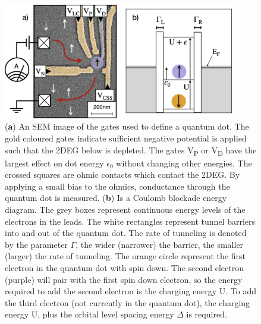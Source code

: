 \begin{figure}[!htb]
 \begin{center}
  \includegraphics[width=0.9\textwidth]{figures/ch1/crop_FiguresMaster.004.png}
  \caption[Quantum dot energy levels]{\label{fig:ch1/dot_energy_levels} 
  (\textbf{a}) An SEM image of the gates used to define a quantum dot. The gold coloured gates indicate sufficient negative potential is applied such that the 2DEG below is depleted. The gates V\textsubscript{P} or V\textsubscript{D} have the largest effect on dot energy $\epsilon_0$ without changing other energies. The crossed squares are ohmic contacts which contact the 2DEG. By applying a small bias to the ohmics, conductance through the quantum dot is measured. (\textbf{b}) Is a Coulomb blockade energy diagram. The grey boxes represent continuous energy levels of the electrons in the leads. The white rectangles represent tunnel barriers into and out of the quantum dot. The rate of tunneling is denoted by the parameter $\Gamma$, the wider (narrower) the barrier, the smaller (larger) the rate of tunneling. The orange circle represent the first electron in the quantum dot with spin down. The second electron (purple) will pair with the first spin down electron, so the energy required to add the second electron is the charging energy $\mathrm{U}$. To add the third electron (not currently in the quantum dot), the charging energy $\mathrm{U}$, plus the orbital level spacing energy $\Delta$ is required.}
 \end{center}
\end{figure}


